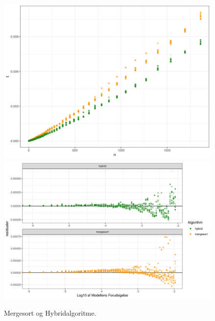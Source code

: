 \begin{figure}
	\begin{center}
		\includegraphics[scale=0.4]{../img/toMergesort.png}
		\includegraphics[scale=0.4]{../img/toMergesortResidual.png}
	\end{center}
	\caption{Mergesort og Hybridalgoritme.}
	\label{fig:Mergesort og Hybridalgoritme}
\end{figure}

